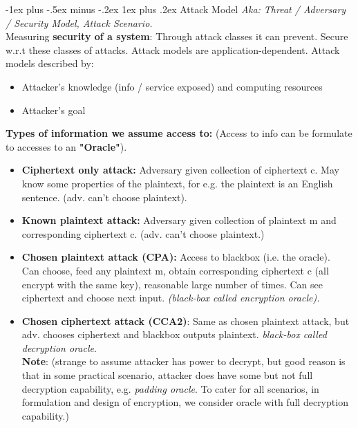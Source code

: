 \documentclass[10pt, landscape]{article}
\makeatletter
\renewcommand{\subsubsection}{\@startsection{subsubsection}{3}{0mm}%
                                {-1ex plus -.5ex minus -.2ex}%
                                {1ex plus .2ex}%
                                {\normalfont\small\bfseries}}
\makeatother
\begin{document}
\begin{multicols*}{3}
\subsubsection{Attack Model}
\textit{Aka: Threat / Adversary / Security Model, Attack Scenario.} \\
Measuring \textbf{security of a system}: Through attack classes it can prevent. Secure w.r.t these classes of attacks. Attack models are application-dependent. Attack models described by:
\begin{itemize}
\item Attacker's knowledge (info / service exposed) and computing resources
\item Attacker's goal
\end{itemize}
\textbf{Types of information we assume access to:} (Access to info can be formulate to accesses to an \textbf{"Oracle"}).
\begin{itemize}
\item \textbf{Ciphertext only attack:} Adversary given collection of ciphertext c. May know some properties 
of the plaintext, for e.g. the plaintext is an English sentence. (adv. can’t choose plaintext).
\item \textbf{Known plaintext attack:} Adversary given collection of plaintext m and corresponding ciphertext c. (adv. can’t choose plaintext.)
\item \textbf{Chosen plaintext attack (CPA):} Access to blackbox (i.e. the oracle). \\
Can choose, feed any plaintext m, obtain corresponding ciphertext c (all encrypt with the same key), reasonable large number of times. Can see ciphertext and choose next input.  \textit{(black-box called encryption oracle).}
\item \textbf{Chosen ciphertext attack (CCA2)}: Same as chosen plaintext attack, but adv. chooses ciphertext and blackbox outputs plaintext. \textit{black-box called decryption oracle}. \\
\textbf{Note}: (strange to assume attacker has power to decrypt, but good reason is that in some practical scenario, attacker does have some but not full decryption capability, e.g. \textit{padding oracle}. To cater for all scenarios, in formulation and design of encryption, we consider oracle with full decryption capability.)
\end{itemize}


\end{multicols*}
\end{document}
